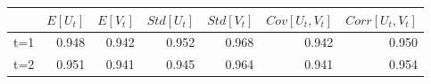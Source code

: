 \begin{tabular}{lrrrrrr}
\toprule
{} &  $E[U_t]$ &  $E[V_t]$ &  $Std[U_t]$ &  $Std[V_t]$ &  $Cov[U_t, V_t]$ &  $Corr[U_t, V_t]$ \\
\midrule
t=1 &     0.948 &     0.942 &       0.952 &       0.968 &            0.942 &             0.950 \\
t=2 &     0.951 &     0.941 &       0.945 &       0.964 &            0.941 &             0.954 \\
\bottomrule
\end{tabular}

